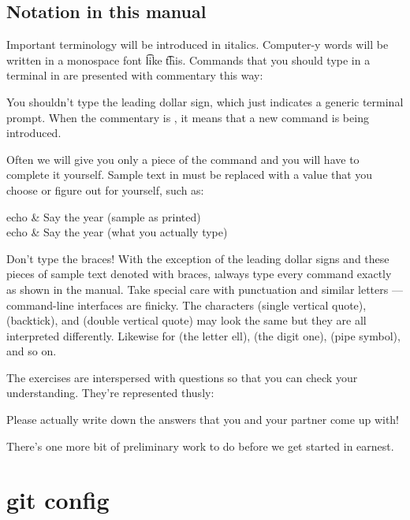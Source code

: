 \documentclass[letterpaper,12pt,titlepage,twoside]{article}
\begin{document}
\subsection*{Notation in this manual}

Important terminology will be introduced in \i{italics}. Computer-y words will
be written in a monospace font \t{like} \t{this}. Commands that you should
type in a terminal in are presented with commentary this way:


You shouldn't type the leading dollar sign, which just indicates a generic
terminal prompt. When the commentary is , it means
that a new command is being introduced.

Often we will give you only a piece of the command and you will have to
complete it yourself. Sample text in  must be replaced with a
value that you choose or figure out for yourself, such as:

\begin{typeme}
echo  & Say the year (sample as printed) \\
echo \the\year & Say the year (what you actually type)
\end{typeme}

Don't type the braces! With the exception of the leading dollar signs and
these pieces of sample text denoted with braces, \i{always type every command
  exactly as shown in the manual}. Take special care with punctuation and
similar letters --- command-line interfaces are finicky. The characters
 (single vertical quote),  (backtick), and
 (double vertical quote) may look the same but they are all
interpreted differently. Likewise for  (the letter ell),
 (the digit one), \fbox{\t{|}} (pipe symbol), and so on.

The exercises are interspersed with questions so that you can check your
understanding. They're represented thusly:


Please actually write down the answers that you and your partner come up with!

There's one more bit of preliminary work to do before we get started in
earnest.


\section{git config}
\end{document}
